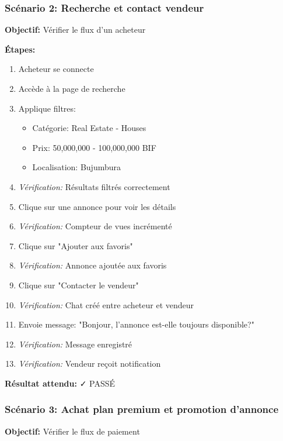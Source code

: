 \subsubsection{Scénario 2: Recherche et contact vendeur}

\textbf{Objectif:} Vérifier le flux d'un acheteur

\textbf{Étapes:}
\begin{enumerate}
    \item Acheteur se connecte
    \item Accède à la page de recherche
    \item Applique filtres:
    \begin{itemize}
        \item Catégorie: Real Estate - Houses
        \item Prix: 50,000,000 - 100,000,000 BIF
        \item Localisation: Bujumbura
    \end{itemize}
    \item \textit{Vérification:} Résultats filtrés correctement
    \item Clique sur une annonce pour voir les détails
    \item \textit{Vérification:} Compteur de vues incrémenté
    \item Clique sur "Ajouter aux favoris"
    \item \textit{Vérification:} Annonce ajoutée aux favoris
    \item Clique sur "Contacter le vendeur"
    \item \textit{Vérification:} Chat créé entre acheteur et vendeur
    \item Envoie message: "Bonjour, l'annonce est-elle toujours disponible?"
    \item \textit{Vérification:} Message enregistré
    \item \textit{Vérification:} Vendeur reçoit notification
\end{enumerate}

\textbf{Résultat attendu:} ✓ PASSÉ

\subsubsection{Scénario 3: Achat plan premium et promotion d'annonce}

\textbf{Objectif:} Vérifier le flux de paiement

